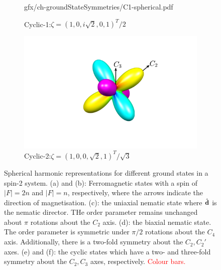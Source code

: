 \begin{figure}
\begin{subfigure}{0.49\textwidth}
        {gfx/ch-groundStateSymmetries/C1-spherical.pdf}
        \caption{\label{subfig: C-1-spherical}
        Cyclic-1:\@ \(\zeta={(1, 0, i\sqrt{2}, 0, 1)}^T/2\)}
    \end{subfigure}
    \begin{subfigure}{0.49\textwidth}
        \includegraphics[width=\textwidth]
        {gfx/ch-groundStateSymmetries/C2-spherical.pdf}
        \caption{\label{subfig: C-2-spherical}
        Cyclic-2:\@ \(\zeta={(1, 0, 0, \sqrt{2}, 1)}^T/\sqrt{3}\)}
    \end{subfigure}
    \caption{\label{fig: spin-2-spherical-harmonics}Spherical harmonic
    representations for different ground states in a spin-2 system.
    (a) and (b): Ferromagnetic states with a spin of \(|F|=2n\) and \(|F|=n\),
    respectively, where the arrows indicate the direction of magnetisation.
    (c): the uniaxial nematic state where \(\hat{\vb{d}}\) is the nematic
    director. THe order parameter remains unchanged about \(\pi \) rotations
    about the \(C_2\) axis.
    (d): the biaxial nematic state. The order parameter is symmetric under
    \(\pi/2\) rotations about the \(C_4\) axis.
    Additionally, there is a two-fold symmetry about the \(C_2, C_2'\) axes.
    (e) and (f): the cyclic states which have a two- and three-fold symmetry
    about the \(C_2, C_3\) axes, respectively.
    \textcolor{red}{Colour bars.}}
\end{figure}

